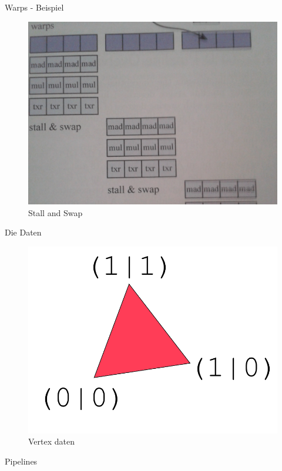 \documentclass[11pt]{beamer}
\begin{document}
\begin{frame}{Warps - Beispiel}
\begin{figure}[hbtp]
\centering
\includegraphics[scale=.14]{swap.png}
\caption{Stall and Swap}
\end{figure}
\end{frame}

\begin{frame}{Die Daten}
\begin{figure}[hbtp]
\centering
\includegraphics[scale=.4]{data.png}
\caption{Vertex daten}
\end{figure}

\end{frame}

\begin{frame}{Pipelines}

\end{frame}
\end{document}
